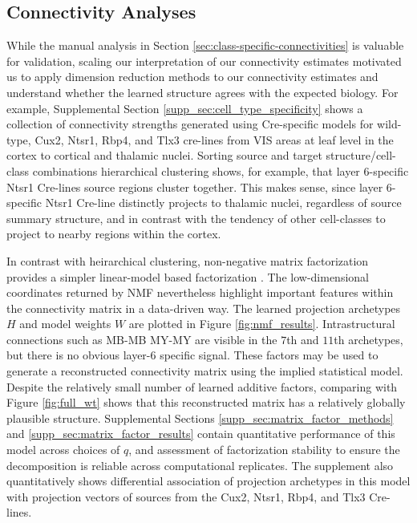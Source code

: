 \newpage

\subsection{Connectivity Analyses}

While the manual analysis in Section \ref{sec:class-specific-connectivities} is valuable for validation, scaling our interpretation of our connectivity estimates motivated us to apply dimension reduction methods to our connectivity estimates and understand whether the learned structure agrees with the expected biology.
For example,  Supplemental Section \ref{supp_sec:cell_type_specificity} shows a collection of connectivity strengths generated using Cre-specific models for wild-type, Cux2, Ntsr1, Rbp4, and Tlx3 cre-lines from VIS areas at leaf level in the cortex to cortical and thalamic nuclei.
Sorting source and target structure/cell-class combinations hierarchical clustering shows, for example, that layer 6-specific Ntsr1 Cre-lines source regions cluster together.
This makes sense, since layer 6-specific Ntsr1 Cre-line distinctly projects to thalamic nuclei, regardless of source summary structure, and in contrast with the tendency of other cell-classes to project to nearby regions within the cortex.

In contrast with heirarchical clustering, non-negative matrix factorization provides a simpler linear-model based factorization \citep{Hastie_2009}.
The low-dimensional coordinates returned by NMF nevertheless highlight important features within the connectivity matrix in a data-driven way.
The learned projection archetypes $H$ and model weights $W$ are plotted in Figure \ref{fig:nmf_results}.
Intrastructural connections such as MB-MB MY-MY are visible in the $7$th and $11$th archetypes, but there is no obvious layer-6 specific signal.
These factors may be used to generate a reconstructed connectivity matrix using the implied statistical model.
Despite the relatively small number of learned additive factors, comparing with Figure \ref{fig:full_wt} shows that this reconstructed matrix has a relatively globally plausible structure.
Supplemental Sections \ref{supp_sec:matrix_factor_methods} and \ref{supp_sec:matrix_factor_results} contain quantitative performance of this model across choices of $q$, and assessment of factorization stability to ensure the decomposition is reliable across computational replicates.
The supplement also quantitatively shows differential association of projection archetypes in this model with projection vectors of sources from the Cux2, Ntsr1, Rbp4, and Tlx3 Cre-lines.

